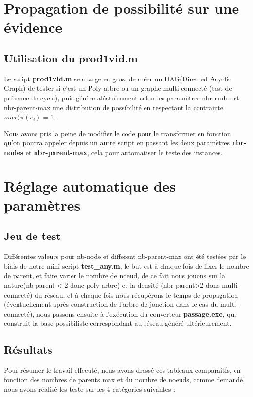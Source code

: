 \documentclass[]{report}
\begin{document}
	\section{Propagation de possibilité sur une évidence}
	\subsection{Utilisation du prod1vid.m}
	Le script \textbf{prod1vid.m} se charge en gros, de créer un DAG(Directed Acyclic Graph) de tester si c'est un Poly-arbre ou un graphe multi-connecté (test de présence de cycle), puis génère aléatoirement selon les paramètres nbr-nodes et nbr-parent-max une distribution de possibilité en respectant la contrainte $max(\pi(e_i)=1$.
	\par Nous avons  pris la peine de modifier le code pour le transformer en fonction qu'on pourra appeler depuis un autre script en passant les deux paramètres \textbf{nbr-nodes} et \textbf{nbr-parent-max}, cela pour automatiser le teste des instances.
	
	\section{Réglage automatique des paramètres}
	\subsection{Jeu de test}
	Différentes valeurs pour nb-node et different nb-parent-max ont été testées par le biais de notre mini script \textbf{test\_any.m}, le but est à chaque fois de fixer le nombre de parent, et faire varier le nombre de noeud, de ce fait nous jouons sur la nature(nb-parent < 2 donc poly-arbre) et la densité (nbr-parent>2 donc multi-connecté) du réseau, et à chaque fois nous récupérons le temps de propagation (éventuellement après construction de l'arbre de jonction dans le cas du multi-connecté), nous passons ensuite à l'exécution du converteur \textbf{passage.exe}, qui construit la base possibiliste correspondant au réseau généré ultérieurement.
	\subsection{Résultats}
	Pour résumer le travail effecuté, nous avons dressé ces tableaux comparaitfs, en fonction des nombres de parents max et du nombre de noeuds, comme demandé, nous avons réalisé les teste sur les 4 catégories suivantes : 
\end{document}
